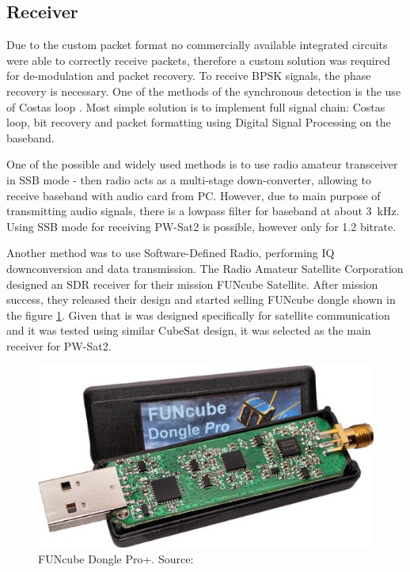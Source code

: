 \subsection{Receiver}
Due to the custom packet format no commercially available integrated circuits were able to correctly receive packets, therefore a custom solution was required for de-modulation and packet recovery.
To receive BPSK signals, the phase recovery is necessary. One of the methods of the synchronous detection is the use of Costas loop \cite{costas_loop}. Most simple solution is to implement full signal chain: Costas loop, bit recovery and packet formatting using Digital Signal Processing on the baseband.

One of the possible and widely used methods is to use radio amateur transceiver in SSB mode - then radio acts as a multi-stage down-converter, allowing to receive baseband with audio card from PC. However, due to main purpose of transmitting audio signals, there is a lowpass filter for baseband at about \SI{3}{\kHz}. Using SSB mode for receiving PW-Sat2 is possible, however only for \SI{1.2}{\kbps} bitrate.

Another method was to use Software-Defined Radio, performing IQ downconversion and data transmission. The Radio Amateur Satellite Corporation designed an SDR receiver for their mission FUNcube Satellite. After mission success, they released their design and started selling FUNcube dongle shown in the figure \ref{funcube_pic}. Given that is was designed specifically for satellite communication and it was tested using similar CubeSat design, it was selected as the main receiver for PW-Sat2.

\begin{figure}[H]
    \centering
    \includegraphics[width=0.6\paperwidth]{img/4/funcube.jpg}
    \caption{FUNcube Dongle Pro+. Source: \cite{funcube}}
    \label{funcube_pic}
\end{figure}

